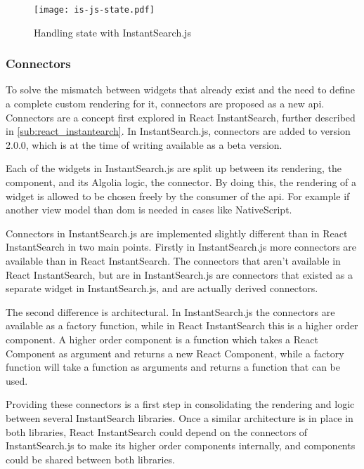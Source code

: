 \begin{figure}[H]
  \centering
  \texttt{[image: is-js-state.pdf]}
  \caption{Handling state with InstantSearch.js}
  \label{figure:is-js-state}
\end{figure}

\subsubsection{Connectors} %
\label{ssub:instantsearch_js_connectors}

To solve the mismatch between widgets that already exist and the need to define a complete custom rendering for it, connectors are proposed as a new \acrshort{api}. Connectors are a concept first explored in React InstantSearch, further described in \ref{sub:react_instantearch}. In InstantSearch.js, connectors are added to version 2.0.0, which is at the time of writing available as a beta version.

Each of the widgets in InstantSearch.js are split up between its rendering, the component, and its Algolia logic, the connector. By doing this, the rendering of a widget is allowed to be chosen freely by the consumer of the \acrshort{api}. For example if another view model than \acrshort{dom} is needed in cases like NativeScript. 

Connectors in InstantSearch.js are implemented slightly different than in React InstantSearch in two main points. Firstly in InstantSearch.js more connectors are available than in React InstantSearch. The connectors that aren't available in React InstantSearch, but are in InstantSearch.js are connectors that existed as a separate widget in InstantSearch.js, and are actually derived connectors.

The second difference is architectural. In InstantSearch.js the connectors are available as a factory function, while in React InstantSearch this is a higher order component. A higher order component is a function which takes a React Component as argument and returns a new React Component, while a factory function will take a function as arguments and returns a function that can be used.

Providing these connectors is a first step in consolidating the rendering and logic between several InstantSearch libraries. Once a similar architecture is in place in both libraries, React InstantSearch could depend on the connectors of InstantSearch.js to make its higher order components internally, and components could be shared between both libraries.

